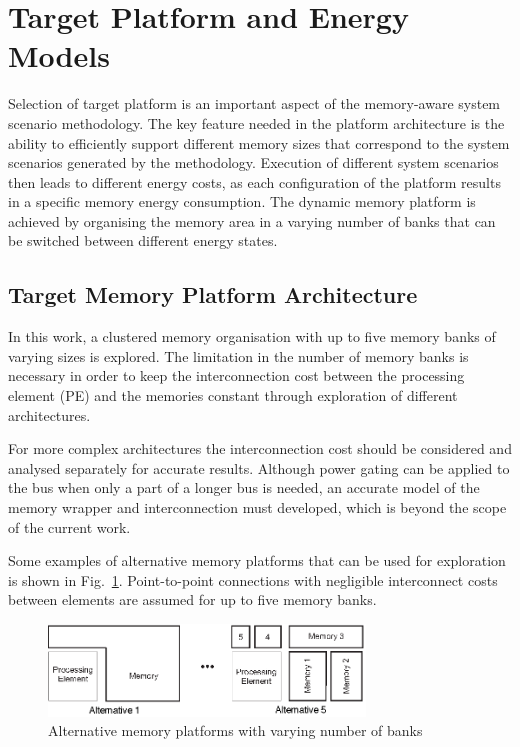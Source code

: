 \documentclass[smallextended]{svjour3}
\begin{document}
\section{Target Platform and Energy Models}
\label{sec:platform}

Selection of target platform is an important aspect of the memory-aware system scenario methodology. 
The key feature needed in the platform architecture is the ability to efficiently support different memory sizes that correspond to the system scenarios generated by the methodology. 
Execution of different system scenarios then leads to different energy costs, as each configuration of the platform results in a specific memory energy consumption. 
The dynamic memory platform is achieved by organising the memory area in a varying number of banks that can be switched between different energy states. 

\subsection{Target Memory Platform Architecture}

In this work, a clustered memory organisation with up to five memory banks of varying sizes is explored. 
The limitation in the number of memory banks is necessary in order to keep the interconnection cost between the processing element (PE) and the memories constant through exploration of different architectures. 

For more complex architectures the interconnection cost should be considered and analysed separately for accurate results. 
Although power gating can be applied to the bus when only a part of a longer bus is needed, an accurate model of the memory wrapper and interconnection must developed, which is beyond the scope of the current work. 

Some examples of alternative memory platforms that can be used for exploration is shown in Fig.~\ref{fig:platform}. 
Point-to-point connections with negligible interconnect costs between elements are assumed for up to five memory banks.

\begin{figure}
\centering
\includegraphics[width=0.75\textwidth]{Images/platform.eps}
\caption{Alternative memory platforms with varying number of banks}
\label{fig:platform}
\end{figure}
\end{document}
